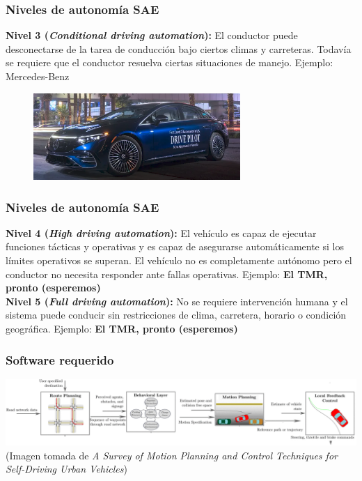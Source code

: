 \begin{frame}\frametitle{Niveles de autonomía SAE}
  \textbf{Nivel 3 (\textit{Conditional driving automation}):} El conductor puede desconectarse de la tarea de conducción bajo ciertos climas y carreteras. Todavía se requiere que el conductor resuelva ciertas situaciones de manejo. Ejemplo: Mercedes-Benz
  \begin{figure}
    \centering
    \includegraphics[width=0.7\textwidth]{Figuras/EjemploSAE3.png}
  \end{figure}
\end{frame}

\begin{frame}\frametitle{Niveles de autonomía SAE}
  \textbf{Nivel 4 (\textit{High driving automation}):} El vehículo es capaz de ejecutar funciones tácticas y operativas y es capaz de asegurarse automáticamente si los límites operativos se superan. El vehículo no es completamente autónomo pero el conductor no necesita responder ante fallas operativas. Ejemplo: \textbf{El TMR, pronto (esperemos)}
  \[\]
  \textbf{Nivel 5 (\textit{Full driving automation}):} No se requiere intervención humana y el sistema puede conducir sin restricciones de clima, carretera, horario o condición geográfica.  Ejemplo: \textbf{El TMR, pronto (esperemos)}
\end{frame}

\begin{frame}\frametitle{Software requerido}
  \includegraphics[width=\textwidth]{Figuras/SoftwareArchitecture.png}
  (Imagen tomada de \textit{A Survey of Motion Planning and Control Techniques for Self-Driving Urban Vehicles})
\end{frame}


